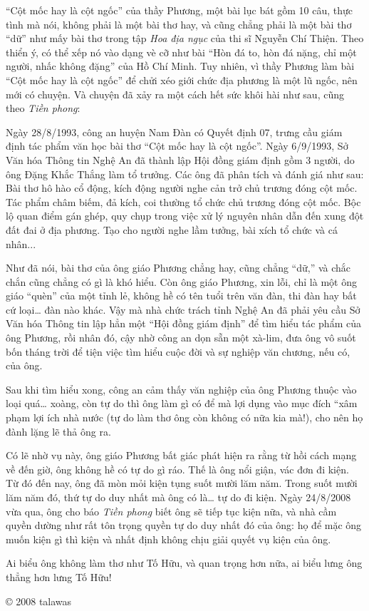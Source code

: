 \documentclass[../main.tex]{subfiles}
\begin{document}
\begin{multicols}{2}
“Cột mốc hay là cột ngốc” của thầy Phương, một bài lục bát gồm 10 câu, thực tình mà nói, không phải là một bài thơ hay, và cũng chẳng phải là một bài thơ “dữ” như mấy bài thơ trong tập \textit{Hoa địa ngục} của thi sĩ Nguyễn Chí Thiện. Theo thiển ý, có thể xếp nó vào dạng vè cỡ như bài “Hòn đá to, hòn đá nặng, chỉ một người, nhấc không đặng” của Hồ Chí Minh. Tuy nhiên, vì thầy Phương làm bài “Cột mốc hay là cột ngốc” để chửi xéo giới chức địa phương là một lũ ngốc, nên mới có chuyện.  
Và chuyện đã xảy ra một cách hết sức khôi hài như sau, cũng theo \textit{Tiền phong}: \begin{blockquote}
 
Ngày 28/8/1993, công an huyện Nam Đàn có Quyết định 07, trưng cầu giám định tác phẩm văn học bài thơ “Cột mốc hay là cột ngốc”. Ngày 6/9/1993, Sở Văn hóa Thông tin Nghệ An đã thành lập Hội đồng giám định gồm 3 người, do ông Đặng Khắc Thắng làm tổ trưởng. Các ông đã phân tích và đánh giá như sau: Bài thơ hô hào cổ động, kích động người nghe cản trở chủ trương đóng cột mốc. Tác phẩm châm biếm, đả kích, coi thường tổ chức chủ trương đóng cột mốc. Bộc lộ quan điểm gán ghép, quy chụp trong việc xử lý nguyên nhân dẫn đến xung đột đất đai ở địa phương. Tạo cho người nghe lầm tưởng, bài xích tổ chức và cá nhân...\end{blockquote}
 

Như đã nói, bài thơ của ông giáo Phương chẳng hay, cũng chẳng “dữ,” và chắc chắn cũng chẳng có gì là khó hiểu. Còn ông giáo Phương, xin lỗi, chỉ là một ông giáo “quèn” của một tỉnh lẻ, không hề có tên tuổi trên văn đàn, thi đàn hay bất cứ loại… đàn nào khác. Vậy mà nhà chức trách tỉnh Nghệ An đã phải yêu cầu Sở Văn hóa Thông tin lập hẳn một “Hội đồng giám định” để tìm hiểu tác phẩm của ông Phương, rồi nhân đó, cậy nhờ công an dọn sẵn một xà-lim, đưa ông vô suốt bốn tháng trời để tiện việc tìm hiểu cuộc đời và sự nghiệp văn chương, nếu có, của ông. 

Sau khi tìm hiểu xong, công an cảm thấy văn nghiệp của ông Phương thuộc vào loại quá… xoàng, còn tự do thì ông làm gì có để mà lợi dụng vào mục đích “xâm phạm lợi ích nhà nước (tự do làm thơ ông còn không có nữa kia mà!), cho nên họ đành lặng lẽ thả ông ra.  

Có lẽ nhờ vụ này, ông giáo Phương bất giác phát hiện ra rằng từ hồi cách mạng về đến giờ, ông không hề có tự do gì ráo. Thế là ông nổi giận, vác đơn đi kiện. Từ đó đến nay, ông đã mòn mỏi kiện tụng suốt mười lăm năm. Trong suốt mười lăm năm đó, thứ tự do duy nhất mà ông có là… tự do đi kiện. Ngày 24/8/2008 vừa qua, ông cho báo \textit{Tiền phong} biết ông sẽ tiếp tục kiện nữa, và nhà cầm quyền dường như rất tôn trọng quyền tự do duy nhất đó của ông: họ để mặc ông muốn kiện gì thì kiện và nhất định không chịu giải quyết vụ kiện của ông. 

Ai biểu ông không làm thơ như Tố Hữu, và quan trọng hơn nữa, ai biểu lưng ông thẳng hơn lưng Tố Hữu! 

© 2008 talawas   
\end{multicols}
\end{document}
